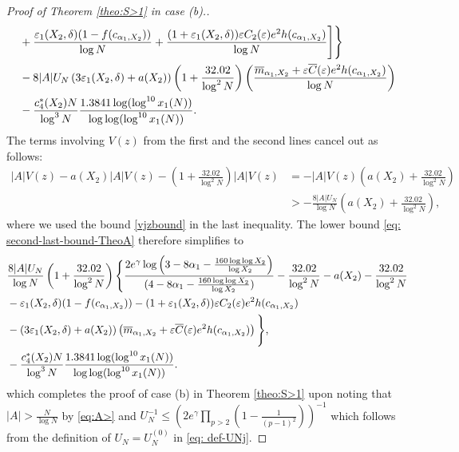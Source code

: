 \documentclass[12pt]{amsart}
\begin{document}
\begin{proof}[Proof of Theorem \ref{theo:S>1} in case (b).]
\begin{align}
    &+\frac{\varepsilon_1(X_2,\delta)(1-f(c_{\alpha_1,X_2}))}{\log N}+\frac{(1+\varepsilon_1(X_2,\delta))\varepsilon C_2(\varepsilon)e^2h(c_{\alpha_1,X_2})}{\log N}\Bigg]\Bigg\}\notag\\
    &-8|A|U_N \left(3\varepsilon_1(X_2,\delta)+a(X_2)\right)\left(1+\frac{32.02}{\log^2N}\right)\left(\frac{\overline{m}_{\alpha_1,X_2}+\varepsilon \overline{C}(\varepsilon)e^2h(c_{\alpha_1,X_2})}{\log N}\right)\notag\\
    &-\frac{c_4^*(X_2)N}{\log^3N}\frac{1.3841\log(\log^{10}x_1(N))}{\log\log(\log^{10}x_1(N))}.\notag 
\end{align}
The terms involving $V(z)$ from the first and the second lines cancel out as follows:
\begin{align*}
    |A|V(z)-a(X_2)|A|V(z) - \left(1 + \frac{32.02}{\log^2 N} \right)|A|V(z) &= -|A|V(z) \left( a(X_2) + \frac{32.02}{\log^2 N}\right) \\
    &> -\frac{8|A|U_N}{\log N} \left( a(X_2) + \frac{32.02}{\log^2 N}\right),
\end{align*}
where we used the bound \eqref{vjzbound} in the last inequality. The lower bound \eqref{eq: second-last-bound-TheoA} therefore simplifies to
\begin{align*}
    &\frac{8|A|U_N}{\log N}\left(1 + \frac{32.02}{\log^2 N} \right)\Bigg\{\frac{2e^{\gamma}\log\left(3-8\alpha_1-\frac{160\log\log X_2}{\log X_2}\right)}{(4-8\alpha_1-\frac{160\log\log X_2}{\log X_2})}-\frac{32.02}{\log^2 N}-a(X_2) - \frac{32.02}{\log^2 N} \nonumber\\
    &-\varepsilon_1(X_2,\delta)(1-f(c_{\alpha_1,X_2}))-(1+\varepsilon_1(X_2,\delta))\varepsilon C_2(\varepsilon)e^2h(c_{\alpha_1,X_2})\nonumber\\
    &-\left(3\varepsilon_1(X_2,\delta)+a(X_2) \right)\left(\overline{m}_{\alpha_1,X_2}+\varepsilon \overline{C}(\varepsilon)e^2h(c_{\alpha_1,X_2})\right)\Bigg\},\notag\\
    &-\frac{c_4^*(X_2)N}{\log^3N}\frac{1.3841\log(\log^{10}x_1(N))}{\log\log(\log^{10}x_1(N))}.
\end{align*}
which completes the proof of case (b) in Theorem \ref{theo:S>1} upon noting that $|A| > \frac{N}{\log N}$ by \eqref{eq:A>} and $U_N^{-1} \le \left(2e^{\gamma}\prod_{p>2}\left(1-\frac{1}{(p-1)^2}\right)\right)^{-1}$ which follows from the definition of $U_N = U^{(0)}_N$ in \eqref{eq: def-UNj}.
\end{proof}
\end{document}
